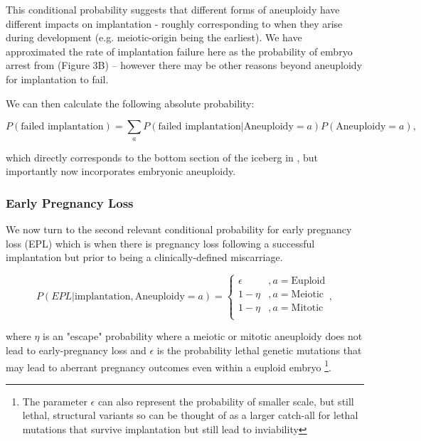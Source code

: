 \documentclass{article}
\begin{document}
This conditional probability suggests that different forms of aneuploidy have different impacts on implantation - roughly corresponding to when they arise during development (e.g. meiotic-origin being the earliest). We have approximated the rate of implantation failure here as the probability of embryo arrest from \citep{McCoy2023-dg} (Figure 3B) -- however there may be other reasons beyond aneuploidy for implantation to fail.  

We can then calculate the following absolute probability:

\begin{equation}
P(\text{failed implantation}) = \sum_{a} P(\text{failed implantation} | \text{Aneuploidy} = a) P(\text{Aneuploidy} = a) ,
\end{equation}

which directly corresponds to the bottom section of the iceberg in \citep{Macklon2002-zn}, but importantly now incorporates embryonic aneuploidy. 


\subsubsection*{Early Pregnancy Loss}

We now turn to the second relevant conditional probability for early pregnancy loss (EPL) which is when there is pregnancy loss following a successful implantation but prior to being a clinically-defined miscarriage. 

\begin{equation}
	P(EPL | \text{implantation}, \text{Aneuploidy}=a) = \begin{cases}
	\epsilon &, a= \text{Euploid}\\
	1 - \eta &, a = \text{Meiotic}\\
	1 - \eta &, a = \text{Mitotic}\\
	\end{cases},
\end{equation}

where $\eta$ is an "escape" probability where a meiotic or mitotic aneuploidy does not lead to early-pregnancy loss and $\epsilon$ is the probability lethal genetic mutations that may lead to aberrant pregnancy outcomes even within a euploid embryo \footnote{The parameter $\epsilon$ can also represent the probability of smaller scale, but still lethal, structural variants so can be thought of as a larger catch-all for lethal mutations that survive implantation but still lead to inviability}. 
\end{document}
